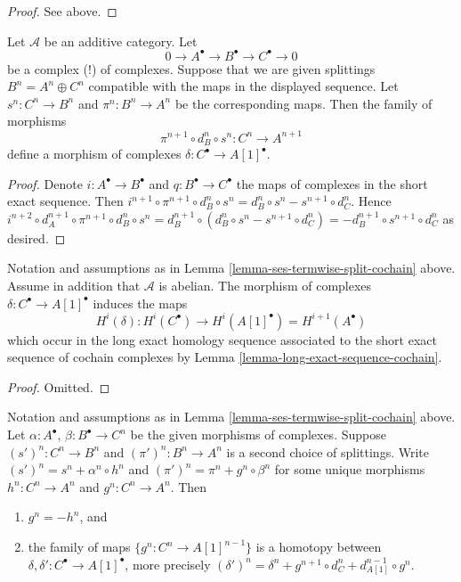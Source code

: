 \begin{proof}
See above.
\end{proof}

\begin{lemma}
\label{lemma-ses-termwise-split-cochain}
Let $\mathcal{A}$ be an additive category.
Let
$$
0 \to A^\bullet \to B^\bullet \to C^\bullet \to 0
$$
be a complex (!) of complexes.
Suppose that we are given splittings $B^n = A^n \oplus C^n$
compatible with the maps in the displayed sequence.
Let $s^n : C^n \to B^n$ and $\pi^n : B^n \to A^n$ be the
corresponding maps. Then the family of morphisms
$$
\pi^{n + 1} \circ d_B^n \circ s^n
:
C^n \to A^{n + 1}
$$
define a morphism of complexes $\delta : C^\bullet \to A[1]^\bullet$.
\end{lemma}

\begin{proof}
Denote $i : A^\bullet \to B^\bullet$ and $q : B^\bullet \to C^\bullet$
the maps of complexes in the short exact sequence. Then
$i^{n + 1} \circ \pi^{n + 1} \circ d_B^n \circ s^n =
d_B^n \circ s^n - s^{n + 1} \circ d_C^n$. Hence
$i^{n + 2} \circ d_A^{n + 1} \circ \pi^{n + 1} \circ d_B^n \circ s^n =
d_B^{n + 1} \circ (d_B^n \circ s^n - s^{n + 1} \circ d_C^n) =
- d_B^{n + 1} \circ s^{n + 1} \circ d_C^n$ as desired.
\end{proof}

\begin{lemma}
\label{lemma-ses-termwise-split-long-cochain}
Notation and assumptions as in
Lemma \ref{lemma-ses-termwise-split-cochain} above.
Assume in addition that $\mathcal{A}$ is abelian.
The morphism of complexes $\delta : C^\bullet \to A[1]^\bullet$
induces the maps
$$
H^i(\delta) :
H^i(C^\bullet) \longrightarrow H^i(A[1]^\bullet) = H^{i + 1}(A^\bullet)
$$
which occur in the long exact homology sequence associated
to the short exact sequence of cochain complexes by
Lemma \ref{lemma-long-exact-sequence-cochain}.
\end{lemma}

\begin{proof}
Omitted.
\end{proof}

\begin{lemma}
\label{lemma-ses-termwise-split-homotopy-cochain}
Notation and assumptions as in
Lemma \ref{lemma-ses-termwise-split-cochain} above.
Let $\alpha : A^\bullet$, $\beta : B^\bullet \to C^n$ be the given
morphisms of complexes.
Suppose $(s')^n : C^n \to B^n$ and $(\pi')^n : B^n \to A^n$
is a second choice of splittings.
Write $(s')^n = s^n + \alpha^n \circ h^n$ and
$(\pi')^n = \pi^n + g^n \circ \beta^n$ for some unique
morphisms $h^n : C^n \to A^n$ and $g^n : C^n \to A^n$. Then
\begin{enumerate}
\item $g^n = - h^n$, and
\item the family of maps $\{g^n : C^n \to A[1]^{n - 1}\}$ is a homotopy
between $\delta, \delta' : C^\bullet \to A[1]^\bullet$, more precisely
$(\delta')^n = \delta^n + g^{n + 1} \circ d_C^n + d_{A[1]}^{n - 1} \circ g^n$.
\end{enumerate}
\end{lemma}

